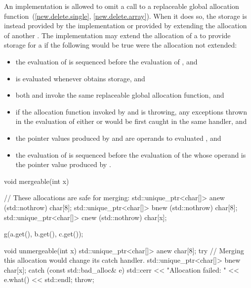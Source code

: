 \pnum
An implementation is allowed to omit a call to a replaceable global allocation
function~(\ref{new.delete.single}, \ref{new.delete.array}). When it does so,
the storage is instead provided by the implementation or provided by extending
the allocation of another . The implementation may
extend the allocation of a   to provide
storage for a   if the
following would be true were the allocation not extended:

\begin{itemize}
\item the evaluation of  is sequenced before the evaluation of
, and

\item {} is evaluated whenever  obtains storage, and

\item both  and  invoke the same replaceable global
allocation function, and

\item if the allocation function invoked by  and  is
throwing, any exceptions thrown in the evaluation of either  or
 would be first caught in the same handler, and

\item the pointer values produced by  and  are operands to
evaluated , and

\item the evaluation of  is sequenced before the evaluation of the
 whose operand is the pointer value produced
by .
\end{itemize}

\enterexample
\begin{codeblock}
  void mergeable(int x) {
    // These allocations are safe for merging:
    std::unique_ptr<char[]> a{new (std::nothrow) char[8]};
    std::unique_ptr<char[]> b{new (std::nothrow) char[8]};
    std::unique_ptr<char[]> c{new (std::nothrow) char[x]};

    g(a.get(), b.get(), c.get());
  }

  void unmergeable(int x) {
    std::unique_ptr<char[]> a{new char[8]};
    try {
      // Merging this allocation would change its catch handler.
      std::unique_ptr<char[]> b{new char[x]};
    } catch (const std::bad_alloc& e) {
      std::cerr << "Allocation failed: " << e.what() << std::endl;
      throw;
    }
  }
\end{codeblock}
\exitexample

